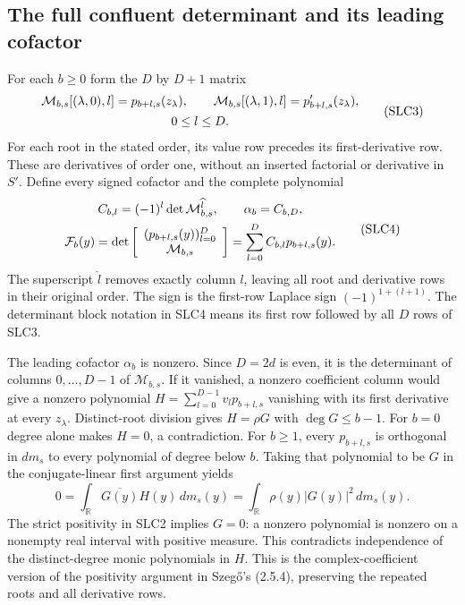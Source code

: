 \documentclass[11pt,a4paper]{article}
\begin{document}
\subsection{The full confluent determinant and its leading cofactor}
For each $b\ge0$ form the $D$ by $D+1$ matrix
\[
\begin{gathered}
 {\cal M}_{b,s}[(\lambda,0),l]=p_{b+l,s}(z_\lambda),\qquad
 {\cal M}_{b,s}[(\lambda,1),l]=p'_{b+l,s}(z_\lambda),\\
 0\le l\le D.
\end{gathered}                                                    \tag{SLC3}
\]
For each root in the stated order, its value row precedes
its first-derivative row. These are derivatives of order one,
without an inserted factorial or derivative in $S'$.
Define every signed cofactor and the complete polynomial
\[
\begin{gathered}
 C_{b,l}=(-1)^l\det{\cal M}_{b,s}^{\widehat l},\qquad
 \alpha_b=C_{b,D},\\
 \mathcal F_b(y)=
 \det\left[\begin{array}{c}
 (p_{b+l,s}(y))_{l=0}^{D}\\
 {\cal M}_{b,s}
 \end{array}\right]
       =\sum_{l=0}^{D}C_{b,l}p_{b+l,s}(y).
\end{gathered}                                                    \tag{SLC4}
\]
The superscript $\widehat l$ removes exactly column $l$,
leaving all root and derivative rows in their original order.
The sign is the first-row Laplace sign $(-1)^{1+(l+1)}$.
The determinant block notation in SLC4 means its first row
followed by all $D$ rows of SLC3.

The leading cofactor $\alpha_b$ is nonzero. Since $D=2d$
is even, it is the determinant of columns $0,\ldots,D-1$
of $\mathcal M_{b,s}$. If it vanished, a nonzero coefficient
column would give a nonzero polynomial
$H=\sum_{l=0}^{D-1}v_lp_{b+l,s}$ vanishing with its first
derivative at every $z_\lambda$. Distinct-root division gives
$H=\rho G$ with $\deg G\le b-1$. For $b=0$ degree alone
makes $H=0$, a contradiction. For $b\ge1$, every
$p_{b+l,s}$ is orthogonal in $dm_s$ to every polynomial
of degree below $b$. Taking that polynomial to be $G$
in the conjugate-linear first argument yields
\[
 0=\int_{\mathbb R}\overline{G(y)}H(y)\,dm_s(y)
     =\int_{\mathbb R}\rho(y)|G(y)|^2\,dm_s(y).
                                                               \tag{SLC5}
\]
The strict positivity in SLC2 implies $G=0$: a nonzero
polynomial is nonzero on a nonempty real interval with
positive measure. This contradicts independence of the
distinct-degree monic polynomials in $H$.
This is the complex-coefficient version of the positivity
argument in Szeg\H{o}'s (2.5.4), preserving the repeated
roots and all derivative rows.
\end{document}
